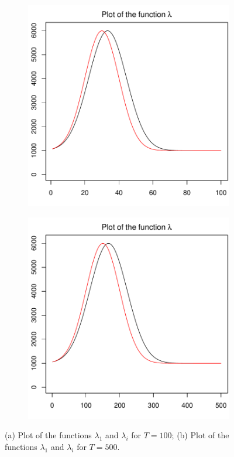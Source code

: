 \documentclass[a4paper,12pt]{article}
\numberwithin{equation}{section}
\begin{document}
\begin{figure}[t!]
\centering
\begin{subfigure}[b]{0.475\textwidth}
\includegraphics[width=\textwidth]{plots/lambda_fcts_shift_to_right_100}
\caption{}
\end{subfigure}\hspace{0.25cm}
\begin{subfigure}[b]{0.475\textwidth}
\includegraphics[width=\textwidth]{plots/lambda_fcts_shift_to_right_500}
\caption{}
\end{subfigure}
\caption{(a) Plot of the functions $\lambda_1$ and $\lambda_i$ for $T = 100$; (b) Plot of the functions $\lambda_1$ and $\lambda_i$ for $T = 500$.}
\end{figure}
\end{document}
